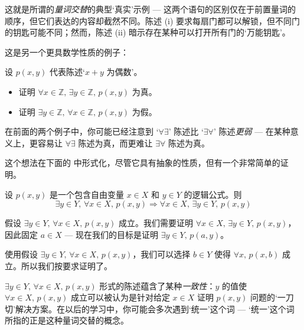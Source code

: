 这就是所谓的\textit{量词交替}的典型`真实'示例 --- 这两个语句的区别仅在于前置量词的顺序，但它们表达的内容却截然不同。陈述 (i) 要求每扇门都可以解锁，但不同门的钥匙可能不同；然而，陈述 (ii) 暗示存在某种可以打开所有门的`万能钥匙'。

这是另一个更具数学性质的例子：

\begin{exercise}
设 $p(x,y)$ 代表陈述`$x + y$ 为偶数'。
\begin{itemize}
\item 证明 $\forall x \in \mathbb{Z},\, \exists y \in \mathbb{Z},\, p(x,y)$ 为真。
\item 证明 $\exists y \in \mathbb{Z},\, \forall x \in \mathbb{Z},\, p(x,y)$ 为假。
\end{itemize}
\end{exercise}

在前面的两个例子中，你可能已经注意到 `$\forall\exists$' 陈述比 `$\exists\forall$' 陈述\textit{更弱} --- 在某种意义上，更容易让 $ \forall\exists$ 陈述为真，而更难让 $\exists\forall$ 陈述为真。

这个想法在下面的  中形式化，尽管它具有抽象的性质，但有一个非常简单的证明。

\begin{theorem}
\label{thmQuantifierAlternation}
设 $p(x,y)$ 是一个包含自由变量 $x \in X$ 和 $y \in Y$ 的逻辑公式。则
\[\exists y \in Y,\, \forall x \in X,\, p(x,y) \Rightarrow \forall x \in X,\, \exists y \in Y,\, p(x,y)\]
\end{theorem}

\begin{cproof}
假设 $\exists y \in Y,\, \forall x \in X,\, p(x,y)$ 成立。我们需要证明 $\forall x \in X,\, \exists y \in Y,\, p(x,y)$，因此固定 $a \in X$ --- 现在我们的目标是证明 $\exists y \in Y,\, p(a,y)$。

使用假设 $\exists y \in Y,\, \forall x \in X,\, p(x,y)$，我们可以选择 $b \in Y$ 使得 $\forall x,\, p(x,b)$ 成立。所以我们按要求证明了。
\end{cproof}

$\exists y \in Y,\, \forall x \in X,\, p(x,y)$ 形式的陈述蕴含了某种\textit{一致性}：$y$ 的值使 $\forall x \in X ,\, p(x,y)$ 成立可以被认为是针对给定 $x \in X$ 证明 $p(x,y)$ 问题的`一刀切'解决方案。在以后的学习中，你可能会多次遇到`统一'这个词 --- `统一'这个词所指的正是这种量词交替的概念。


